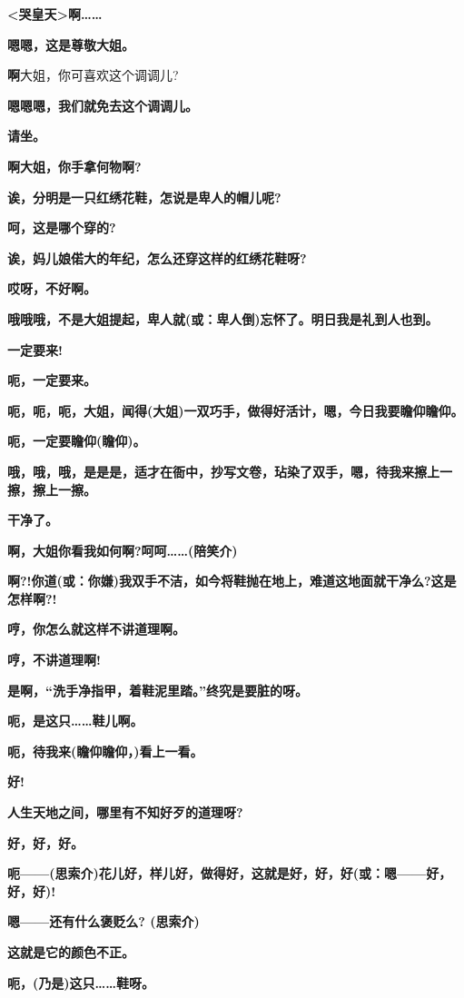 \textbf{\textless{}哭皇天\textgreater{}啊\ldots{}\ldots{}}

\textbf{嗯嗯，这是尊敬大姐。}

\textbf{啊}大姐，你可喜欢这个调调儿?

\textbf{嗯嗯嗯，我们就免去这个调调儿。}

\textbf{请坐。}

\textbf{啊大姐，你手拿何物啊?}

\textbf{诶，分明是一只红绣花鞋，怎说是卑人的帽儿呢?}

\textbf{呵，这是哪个穿的?}

\textbf{诶，妈儿娘偌大的年纪，怎么还穿这样的红绣花鞋呀?}

\textbf{哎呀，不好啊。}

\textbf{哦哦哦，不是大姐提起，卑人就(或：卑人倒)忘怀了。明日我是礼到人也到。}

\textbf{一定要来!}

\textbf{呃，一定要来。}

\textbf{呃，呃，呃，大姐，闻得(大姐)一双巧手，做得好活计，嗯，今日我要瞻仰瞻仰。}

\textbf{呃，一定要瞻仰(瞻仰)。}

\textbf{哦，哦，哦，是是是，适才在衙中，抄写文卷，玷染了双手，嗯，待我来擦上一擦，擦上一擦。}

\textbf{干净了。}

\textbf{啊，大姐你看我如何啊?呵呵\ldots{}\ldots{}(陪笑介)}

\textbf{啊?!你道(或：你嫌)我双手不洁，如今将鞋抛在地上，难道这地面就干净么?这是怎样啊?!}

\textbf{哼，你怎么就这样不讲道理啊。}

\textbf{哼，不讲道理啊!}

\textbf{是啊，``洗手净指甲，着鞋泥里踏。''终究是要脏的呀。}

\textbf{呃，是这只\ldots{}\ldots{}鞋儿啊。}

\textbf{呃，待我来(瞻仰瞻仰，)看上一看。}

\textbf{好!}

\textbf{人生天地之间，哪里有不知好歹的道理呀?}

\textbf{好，好，好。}

\textbf{呃------(思索介)花儿好，样儿好，做得好，这就是好，好，好(或：嗯------好，好，好)!}

\textbf{嗯------还有什么褒贬么? (思索介)}

\textbf{这就是它的颜色不正。}

\textbf{呃，(乃是)这只\ldots{}\ldots{}鞋呀。}

